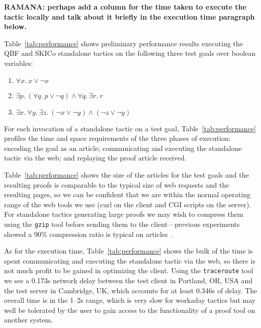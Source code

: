 \documentclass{llncs}
\begin{document}
\textbf{RAMANA: perhaps add a column for the time taken to execute the tactic locally and talk about it briefly in the execution time paragraph below.}

Table~\ref{tab:performance} shows preliminary performance results executing the QBF and SKICo standalone tactics on the following three test goals over boolean variables:
\begin{enumerate}
\item $\forall x.\ x \lor\lnot x$

\item $\exists p.\ (\forall q.\ p \lor\lnot q) \land\forall q.\ \exists r.\ r$

\item $\exists x.\ \forall y.\ \exists z.\ (\lnot x \lor\lnot y) \land (\lnot z\lor\lnot y)$
\end{enumerate}
For each invocation of a standalone tactic on a test goal, Table~\ref{tab:performance} profiles the time and space requirements of the three phases of execution: encoding the goal as an article; communicating and executing the standalone tactic via the web; and replaying the proof article received.

Table~\ref{tab:performance} shows the size of the articles for the test goals and the resulting proofs is comparable to the typical size of web requests and the resulting pages, so we can be confident that we are within the normal operating range of the web tools we use (curl on the client and CGI scripts on the server). For standalone tactics generating large proofs we may wish to compress them using the \texttt{gzip} tool before sending them to the client---previous experiments showed a 90\% compression ratio is typical on articles~\cite{hurd2009}.

As for the execution time, Table~\ref{tab:performance} shows the bulk of the time is spent communicating and executing the standalone tactic via the web, so there is not much profit to be gained in optimizing the client. Using the \texttt{traceroute} tool we see a 0.173s network delay between the test client in Portland, OR, USA and the test server in Cambridge, UK, which accounts for at least 0.346s of delay. The overall time is in the 1--2s range, which is very slow for workaday tactics but may well be tolerated by the user to gain access to the functionality of a proof tool on another system.

\end{document}
